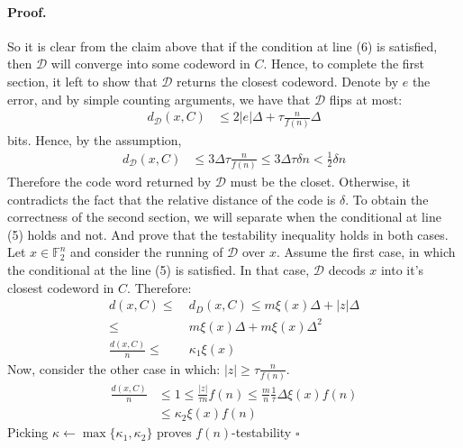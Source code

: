 \documentclass{article}
\begin{document}
\begin{multicols*}{2}
\paragraph{Proof.} So it is clear from the claim above that if the condition at line (6) is satisfied, then $\mathcal{D}$  will converge into some codeword in $C$. Hence, to complete the first section, it left to show that $\mathcal{D}$ returns the closest codeword. Denote by $e$ the error, and by simple counting arguments, we have that $\mathcal{D}$ flips at most:  
\begin{equation*}
  \begin{split}
    d_{\mathcal{D}}\left( x, C \right) & \le 2|e|\Delta + \tau \frac{n}{f\left( n \right)}\Delta
  \end{split}
\end{equation*}
bits. Hence, by the assumption, 
\begin{equation*}
  \begin{split}
    d_{\mathcal{D}}\left( x, C \right) & \le 3\Delta \tau \frac{n}{f\left( n \right)} \le 3\Delta \tau\delta n < \frac{1}{2} \delta n  
  \end{split}
\end{equation*}
Therefore the code word returned by $\mathcal{D}$ must be the closet. Otherwise, it contradicts the fact that the relative distance of the code is $\delta$.
To obtain the correctness of the second section, we will separate when the conditional at line (5) holds and not. And prove that the testability inequality holds in both cases. 
Let $x \in \mathbb{F}_{2}^{n}$ and consider the running of $\mathcal{D}$ over $x$. Assume the first case, in which the conditional at the line (5) is satisfied. In that case, $\mathcal{D}$ decods $x$ into it's closest codeword in $C$. Therefore:
\begin{equation*}
  \begin{split}
    d\left( x, C \right) \le & \ d_{D} \left( x, C \right) \le m\xi\left( x \right)\Delta +  |z|\Delta  \\ \le &  \  m\xi\left( x \right)\Delta + m\xi\left( x \right)  \Delta^{2} \\ 
     \frac{d\left( x, C \right)}{n} \le & \  \kappa_{1} \xi\left( x \right)    
  \end{split}
\end{equation*}
Now, consider the other case in which: $ |z| \ge \tau \frac{n}{f\left( n \right)}  $.
\begin{equation*}
  \begin{split}
    \frac{d\left( x, C \right)}{n} & \le 1 \le \frac{|z|}{\tau n}f\left( n \right) \le \frac{m}{n} \frac{1}{\tau} \Delta \xi\left( x\right)f\left( n \right) \\ & \le \kappa_{2} \xi\left( x \right)f\left( n \right)  
  \end{split}
\end{equation*}
Picking $ \kappa \leftarrow \max \{ \kappa_{1}, \kappa_{2} \}$ proves $f\left( n \right)$-testability $\square$
  \printbibliography 
\end{multicols*}
\end{document}
